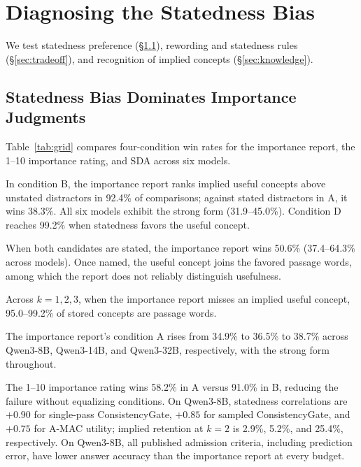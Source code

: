 \section{Diagnosing the Statedness Bias}\label{sec:diagnosis}

We test statedness preference (\S\ref{sec:bias}), rewording and statedness rules (\S\ref{sec:tradeoff}), and recognition of implied concepts (\S\ref{sec:knowledge}).

\subsection{Statedness Bias Dominates Importance Judgments}\label{sec:bias}\label{sec:gap}

Table~\ref{tab:grid} compares four-condition win rates for the importance report, the 1--10 importance rating, and SDA across six models.


In condition B, the importance report ranks implied useful concepts above unstated distractors in 92.4\% of comparisons; against stated distractors in A, it wins 38.3\%. All six models exhibit the strong form (31.9--45.0\%). Condition D reaches 99.2\% when statedness favors the useful concept.

When both candidates are stated, the importance report wins 50.6\% (37.4--64.3\% across models). Once named, the useful concept joins the favored passage words, among which the report does not reliably distinguish usefulness.

Across $k=1,2,3$, when the importance report misses an implied useful concept, 95.0--99.2\% of stored concepts are passage words.

The importance report's condition A rises from 34.9\% to 36.5\% to 38.7\% across Qwen3-8B, Qwen3-14B, and Qwen3-32B, respectively, with the strong form throughout.

The 1--10 importance rating wins 58.2\% in A versus 91.0\% in B, reducing the failure without equalizing conditions. On Qwen3-8B, statedness correlations are $+0.90$ for single-pass ConsistencyGate, $+0.85$ for sampled ConsistencyGate, and $+0.75$ for A-MAC utility; implied retention at $k=2$ is 2.9\%, 5.2\%, and 25.4\%, respectively. On Qwen3-8B, all published admission criteria, including prediction error, have lower answer accuracy than the importance report at every budget.

